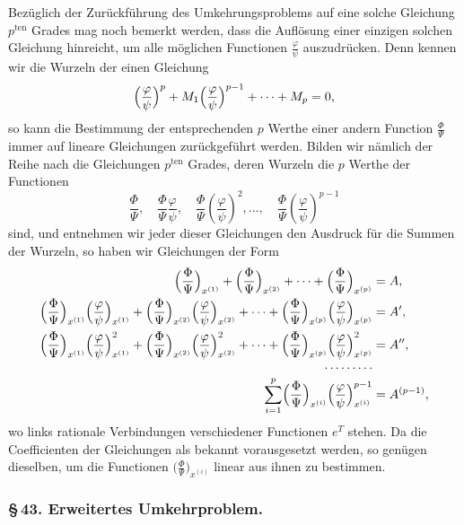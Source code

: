 \documentclass[10pt]{article}
\begin{document}
Bezüglich der Zurückführung des Umkehrungsproblems auf eine solche Gleichung \(p^{\mathrm{ten}}\) Grades mag noch bemerkt werden, dass die Auflösung einer einzigen solchen Gleichung hinreicht, um alle möglichen Functionen \(\frac{\varphi}{\psi}\) auszudrücken. Denn kennen wir die Wurzeln der einen Gleichung
\[
\Bigl(\frac{\varphi}{\psi}\Bigr)^p+M_1\Bigl(\frac{\varphi}{\psi}\Bigr)^{p-1}+\cdots+M_p=0,
\]
so kann die Bestimmung der entsprechenden \(p\) Werthe einer andern Function \(\frac{\Phi}{\Psi}\) immer auf lineare Gleichungen zurückgeführt werden. Bilden wir nämlich der Reihe nach die Gleichungen \(p^{\mathrm{ten}}\) Grades, deren Wurzeln die \(p\) Werthe der Functionen
\[
\frac{\Phi}{\Psi},\quad \frac{\Phi}{\Psi}\frac{\varphi}{\psi},\quad
\frac{\Phi}{\Psi}\left(\frac{\varphi}{\psi}\right)^2,
\ldots,\quad
\frac{\Phi}{\Psi}\left(\frac{\varphi}{\psi}\right)^{p-1}
\]
sind, und entnehmen wir jeder dieser Gleichungen den Ausdruck für die Summen der Wurzeln, so haben wir Gleichungen der Form
\[
\begin{aligned}
\Bigl(\frac{\Phi}{\Psi}\Bigr)_{x^{(1)}}+\Bigl(\frac{\Phi}{\Psi}\Bigr)_{x^{(2)}}+\cdots+\Bigl(\frac{\Phi}{\Psi}\Bigr)_{x^{(p)}}&=A,\\
\Bigl(\frac{\Phi}{\Psi}\Bigr)_{x^{(1)}}\Bigl(\frac{\varphi}{\psi}\Bigr)_{x^{(1)}}+\Bigl(\frac{\Phi}{\Psi}\Bigr)_{x^{(2)}}\Bigl(\frac{\varphi}{\psi}\Bigr)_{x^{(2)}}+\cdots+\Bigl(\frac{\Phi}{\Psi}\Bigr)_{x^{(p)}}\Bigl(\frac{\varphi}{\psi}\Bigr)_{x^{(p)}}&=A',\\
\Bigl(\frac{\Phi}{\Psi}\Bigr)_{x^{(1)}}\Bigl(\frac{\varphi}{\psi}\Bigr)_{x^{(1)}}^{2}+\Bigl(\frac{\Phi}{\Psi}\Bigr)_{x^{(2)}}\Bigl(\frac{\varphi}{\psi}\Bigr)_{x^{(2)}}^{2}+\cdots+\Bigl(\frac{\Phi}{\Psi}\Bigr)_{x^{(p)}}\Bigl(\frac{\varphi}{\psi}\Bigr)_{x^{(p)}}^{2}&=A'',\\[-0.3em]
\cdots\cdots\cdots&\\[-0.3em]
\sum_{i=1}^{p}\Bigl(\frac{\Phi}{\Psi}\Bigr)_{x^{(i)}}\Bigl(\frac{\varphi}{\psi}\Bigr)_{x^{(i)}}^{p-1}&=A^{(p-1)},
\end{aligned}
\]
wo links rationale Verbindungen verschiedener Functionen \(e^T\) stehen. Da die Coefficienten der Gleichungen als bekannt vorausgesetzt werden, so genügen dieselben, um die Functionen \(\bigl(\frac{\Phi}{\Psi}\bigr)_{x^{(i)}}\) linear aus ihnen zu bestimmen.

\subsubsection*{\S\,43. Erweitertes Umkehrproblem.}
\end{document}
